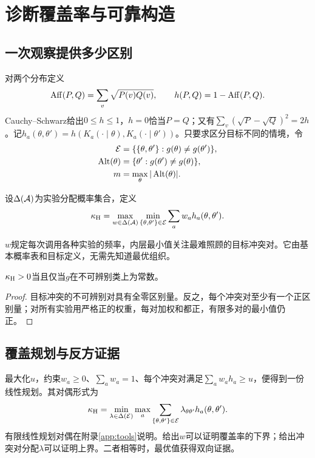 \chapter{诊断覆盖率与可靠构造}
\label{ch:coverage}

\section{一次观察提供多少区别}
对两个分布定义
\[
 \operatorname{Aff}(P,Q)=\sum_v\sqrt{P(v)Q(v)},\qquad h(P,Q)=1-\operatorname{Aff}(P,Q).
\]
Cauchy--Schwarz给出$0\le h\le1$，$h=0$恰当$P=Q$；又有$\sum_v(\sqrt P-\sqrt Q)^2=2h$。记$h_a(\theta,\theta')=h(K_a(\cdot\mid\theta),K_a(\cdot\mid\theta'))$。只要求区分目标不同的情境，令
\[
\begin{aligned}
 \mathcal E&=\{\{\theta,\theta'\}:g(\theta)\ne g(\theta')\},\\
 \operatorname{Alt}(\theta)&=\{\theta':g(\theta')\ne g(\theta)\},\\
 m&=\max_\theta|\operatorname{Alt}(\theta)|.
\end{aligned}
\]
\begin{definition}[诊断覆盖率]
设$\Delta(\mathcal A)$为实验分配概率集合，定义
\begin{equation}
 \kappa_{\mathrm H}=\max_{w\in\Delta(\mathcal A)}\min_{\{\theta,\theta'\}\in\mathcal E}
                  \sum_aw_ah_a(\theta,\theta').
 \label{eq:coverage-rate}
\end{equation}
\end{definition}
$w$规定每次调用各种实验的频率，内层最小值关注最难照顾的目标冲突对。它由基本概率表和目标定义，无需先知道最优组织。

\begin{proposition}[正覆盖率的精确条件]
\label{prop:positive}
$\kappa_{\mathrm H}>0$当且仅当$g$在不可辨别类上为常数。
\end{proposition}
\begin{proof}
目标冲突的不可辨别对具有全零区别量。反之，每个冲突对至少有一个正区别量；对所有实验用严格正的权重，每对加权和都正，有限多对的最小值仍正。
\end{proof}

\section{覆盖规划与反方证据}
最大化$u$，约束$w_a\ge0$、$\sum_aw_a=1$、每个冲突对满足$\sum_aw_ah_a\ge u$，便得到一份线性规划。其对偶形式为
\begin{equation}
 \kappa_{\mathrm H}=\min_{\lambda\in\Delta(\mathcal E)}\max_a
        \sum_{\{\theta,\theta'\}\in\mathcal E}\lambda_{\theta\theta'}h_a(\theta,\theta').
 \label{eq:dual}
\end{equation}
有限线性规划对偶在附录\ref{app:tools}说明。给出$w$可以证明覆盖率的下界；给出冲突对分配$\lambda$可以证明上界。二者相等时，最优值获得双向证据。

